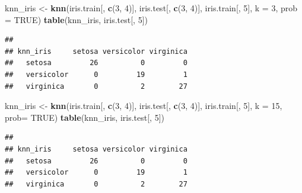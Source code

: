 \documentclass[]{article}
\newenvironment{Shaded}{\begin{snugshade}}{\end{snugshade}}
\newcommand{\KeywordTok}[1]{\textcolor[rgb]{0.13,0.29,0.53}{\textbf{#1}}}
\newcommand{\DataTypeTok}[1]{\textcolor[rgb]{0.13,0.29,0.53}{#1}}
\newcommand{\DecValTok}[1]{\textcolor[rgb]{0.00,0.00,0.81}{#1}}
\newcommand{\StringTok}[1]{\textcolor[rgb]{0.31,0.60,0.02}{#1}}
\newcommand{\OtherTok}[1]{\textcolor[rgb]{0.56,0.35,0.01}{#1}}
\newcommand{\NormalTok}[1]{#1}
\begin{document}
\begin{Shaded}
\begin{Highlighting}[]
\NormalTok{knn_iris <-}\StringTok{ }\KeywordTok{knn}\NormalTok{(iris.train[, }\KeywordTok{c}\NormalTok{(}\DecValTok{3}\NormalTok{, }\DecValTok{4}\NormalTok{)], iris.test[, }\KeywordTok{c}\NormalTok{(}\DecValTok{3}\NormalTok{, }\DecValTok{4}\NormalTok{)], iris.train[, }\DecValTok{5}\NormalTok{], }\DataTypeTok{k =} \DecValTok{3}\NormalTok{, }\DataTypeTok{prob =} \OtherTok{TRUE}\NormalTok{)}
\KeywordTok{table}\NormalTok{(knn_iris, iris.test[, }\DecValTok{5}\NormalTok{])}
\end{Highlighting}
\end{Shaded}

\begin{verbatim}
##             
## knn_iris     setosa versicolor virginica
##   setosa         26          0         0
##   versicolor      0         19         1
##   virginica       0          2        27
\end{verbatim}

\begin{Shaded}
\begin{Highlighting}[]
\NormalTok{knn_iris <-}\StringTok{ }\KeywordTok{knn}\NormalTok{(iris.train[, }\KeywordTok{c}\NormalTok{(}\DecValTok{3}\NormalTok{, }\DecValTok{4}\NormalTok{)], iris.test[, }\KeywordTok{c}\NormalTok{(}\DecValTok{3}\NormalTok{, }\DecValTok{4}\NormalTok{)], iris.train[, }\DecValTok{5}\NormalTok{], }\DataTypeTok{k =} \DecValTok{15}\NormalTok{, }\DataTypeTok{prob=} \OtherTok{TRUE}\NormalTok{)}
\KeywordTok{table}\NormalTok{(knn_iris, iris.test[, }\DecValTok{5}\NormalTok{])}
\end{Highlighting}
\end{Shaded}

\begin{verbatim}
##             
## knn_iris     setosa versicolor virginica
##   setosa         26          0         0
##   versicolor      0         19         1
##   virginica       0          2        27
\end{verbatim}
\end{document}
